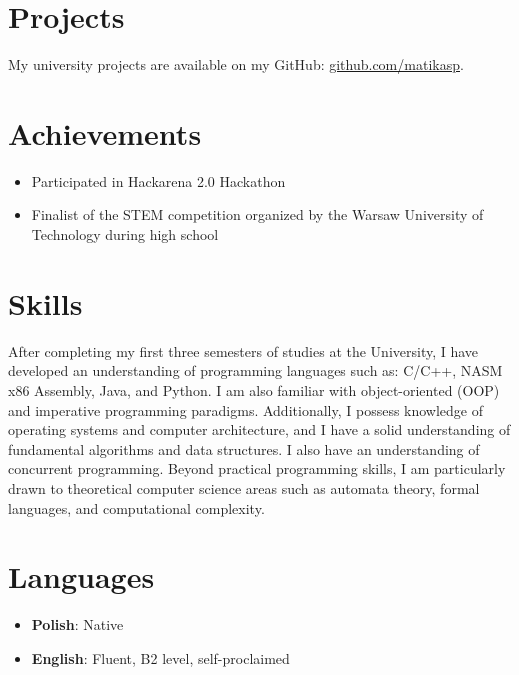 \documentclass[a4paper,10pt]{article}
\begin{document}
\section*{Projects}
My university projects are available on my GitHub: \href{https://github.com/matikasp}{github.com/matikasp}.

\section*{Achievements}
\begin{itemize}[left=0pt]
    \item Participated in Hackarena 2.0 Hackathon
    \item Finalist of the STEM competition organized by the Warsaw University of Technology during high school
\end{itemize}

\section*{Skills}
After completing my first three semesters of studies at the University, I have developed an understanding of programming languages such as: C/C++, NASM x86 Assembly, Java, and Python. I am also familiar with object-oriented (OOP) and imperative programming paradigms. Additionally, I possess knowledge of operating systems and computer architecture, and I have a solid understanding of fundamental algorithms and data structures. I also have an understanding of concurrent programming.
Beyond practical programming skills, I am particularly drawn to theoretical computer science areas such as automata theory, formal languages, and computational complexity.
\section*{Languages}
\begin{itemize}[left=0pt]
    \item \textbf{Polish}: Native
    \item \textbf{English}: Fluent, B2 level, self-proclaimed
\end{itemize}
\end{document}

